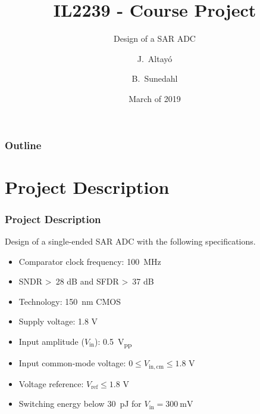 \documentclass{beamer}
\title{IL2239 - Course Project}
\subtitle{Design of a SAR ADC}
\author{J.~Altayó \and B.~Sunedahl}
\date{March of 2019}
\newcommand*{\subb}[1]{\ensuremath{_{\mathrm{#1}}}}
\begin{document}
  \section*{}
  \begin{frame}[plain, t]
    \titlepage
  \end{frame}

  \begin{frame}
    \frametitle{Outline}
    \begin{multicols}{2}
    \tableofcontents
    \end{multicols}
  \end{frame}

  \section{Project Description}
  \begin{frame}
    \frametitle{Project Description}
    Design of a single-ended SAR ADC with the following specifications.
    \begin{itemize}
      \item Comparator clock frequency: \SI{100}{\MHz}
      \item SNDR \textgreater\ 28 dB and SFDR \textgreater\ 37 dB
      \item Technology: \SI{150}{\nm} CMOS
      \item Supply voltage: 1.8 V
      \item Input amplitude ($V\subb{in}$): \SI{0.5}{\volt_{pp}}
      \item Input common-mode voltage: $0 \leq V\subb{in,cm} \leq 1.8$ V
      \item Voltage reference: $V\subb{ref} \leq 1.8$ V
      \item Switching energy below \SI{30}{\pico\joule} for $V\subb{in}=\SI{300}{\mV}$
    \end{itemize}
  \end{frame}
\end{document}
